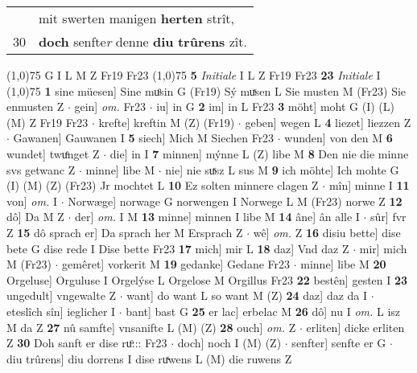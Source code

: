 \documentclass[8pt,a4paper,notitlepage]{article}
\begin{document}
\begin{table}[ht]
\begin{minipage}[t]{0.5\linewidth}
\begin{tabular}{rl}
 & mit swerten manigen \textbf{herten} strît,\\ 
30 & \textbf{doch} senfte\textit{r} denne \textbf{diu} \textbf{trûrens} zît.\\ 
\end{tabular}
\scriptsize
\line(1,0){75} \newline
G I L M Z Fr19 Fr23 \newline
\line(1,0){75} \newline
\textbf{5} \textit{Initiale} I L Z Fr19 Fr23  \textbf{23} \textit{Initiale} I  \newline
\line(1,0){75} \newline
\textbf{1} sine müesen] Sine muͦsin G (Fr19) Sý muͯsen L Sie musten M (Fr23) Sie enmusten Z  $\cdot$ gein] \textit{om.} Fr23  $\cdot$ iu] in G \textbf{2} im] in L Fr23 \textbf{3} möht] moht G (I) (L) (M) Z Fr19 Fr23  $\cdot$ krefte] kreftin M (Z) (Fr19)  $\cdot$ geben] wegen L \textbf{4} liezet] liezzen Z  $\cdot$ Gawanen] Gauwanen I \textbf{5} siech] Mich M Siechen Fr23  $\cdot$ wunden] von den M \textbf{6} wundet] twuͤnget Z  $\cdot$ die] in I \textbf{7} minnen] mýnne L (Z) libe M \textbf{8} Den nie die minne svs getwanc Z  $\cdot$ minne] libe M  $\cdot$ nie] nie suͯsz L sus M \textbf{9} ich möhte] Ich mohte G (I) (M) (Z) (Fr23) Jr mochtet L \textbf{10} Ez solten minnere clagen Z  $\cdot$ mîn] minne I \textbf{11} von] \textit{om.} I  $\cdot$ Norwæge] norwage G norwengen I Norwege L M (Fr23) norwe Z \textbf{12} dô] Da M Z  $\cdot$ der] \textit{om.} I M \textbf{13} minne] minnen I libe M \textbf{14} âne] ân alle I  $\cdot$ sûr] fvr Z \textbf{15} dô sprach er] Da sprach her M Ersprach Z  $\cdot$ wê] \textit{om.} Z \textbf{16} disiu bette] dise bete G dise rede I Dise bette Fr23 \textbf{17} mich] mir L \textbf{18} daz] Vnd daz Z  $\cdot$ mir] mich M (Fr23)  $\cdot$ gemêret] vorkerit M \textbf{19} gedanke] Gedane Fr23  $\cdot$ minne] libe M \textbf{20} Orgeluse] Orguluse I Orgelýse L Orgelose M Orgillus Fr23 \textbf{22} bestên] gesten I \textbf{23} ungedult] vngewalte Z  $\cdot$ want] do want L so want M (Z) \textbf{24} daz] daz da I  $\cdot$ eteslîch sîn] ieglicher I  $\cdot$ bant] bast G \textbf{25} er lac] erbelac M \textbf{26} dô] nu I \textit{om.} L isz M da Z \textbf{27} nû samfte] vnsanifte L (M) (Z) \textbf{28} ouch] \textit{om.} Z  $\cdot$ erliten] dicke erliten Z \textbf{30} Doh sanft er dise ruͦ::: Fr23  $\cdot$ doch] noch I (M) (Z)  $\cdot$ senfter] senfte er G  $\cdot$ diu trûrens] diu dorrens I dise ruͯwens L (M) die ruwens Z \newline
\end{minipage}

\end{table}
\end{document}
